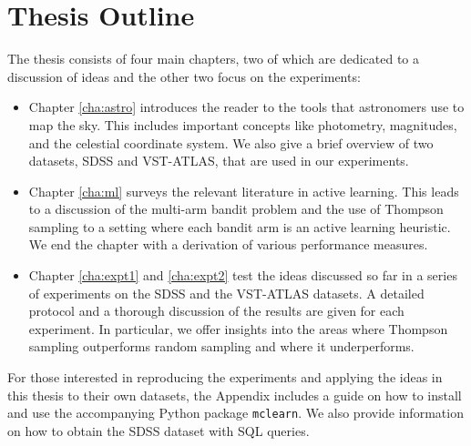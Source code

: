 \section{Thesis Outline}
\label{sec:orgnisation}
The thesis consists of four main chapters, two of which are dedicated to a discussion of ideas and
the other two focus on the experiments:
	\begin{itemize}
		\item Chapter \ref{cha:astro} introduces the reader to the tools that astronomers use
		to map the sky. This includes important concepts like photometry, magnitudes, and the
		celestial coordinate system. We also give a brief overview of two datasets, SDSS and
		VST-ATLAS, that are used in our experiments.
		
		\item Chapter \ref{cha:ml} surveys the relevant literature in active learning. This leads
		to  a discussion of the multi-arm bandit problem and the use of Thompson sampling to a
		setting where each bandit arm is an active learning heuristic. We end the chapter with a 
		derivation of various performance measures.
		
		\item Chapter \ref{cha:expt1} and \ref{cha:expt2} test the ideas discussed so far in a
		series of experiments on the SDSS and the VST-ATLAS datasets. A detailed protocol and a
		thorough discussion of the results are given for each experiment. In particular, we offer
		insights into the areas where Thompson sampling outperforms random sampling and where it
		underperforms. 
	\end{itemize}
For those interested in reproducing the experiments and applying the ideas in this thesis
to their own datasets, the Appendix includes a guide on how to install and use the accompanying
Python package \texttt{mclearn}. We also provide information on how to obtain the SDSS dataset
with SQL queries.



